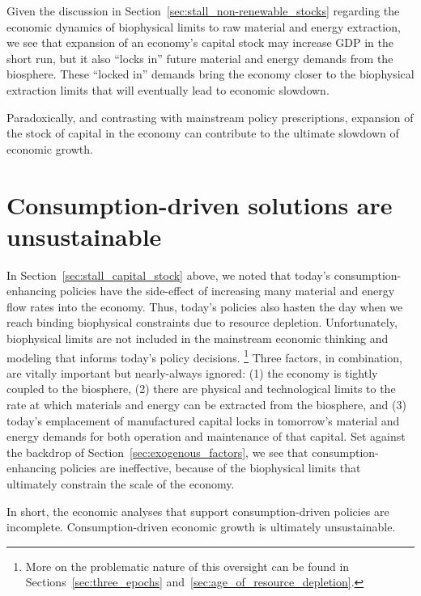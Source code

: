 Given the discussion in Section~\ref{sec:stall_non-renewable_stocks}
regarding the economic dynamics 
of biophysical limits to raw material and energy extraction,
we see that expansion of an economy's capital stock may increase GDP
in the short run, 
but it also ``locks in'' 
future material and energy demands 
from the biosphere.
These ``locked in'' demands bring the economy closer 
to the biophysical extraction limits 
that will eventually lead to economic slowdown.

\begin{svgraybox}
	Paradoxically, and contrasting with mainstream policy prescriptions,
	expansion of the stock of capital in the economy 
	can contribute to the ultimate slowdown of economic growth.
\end{svgraybox}


\section{Consumption-driven solutions are unsustainable}
\label{sec:consumption_unsustainable}

In Section~\ref{sec:stall_capital_stock} above, 
we noted that today's consumption-enhancing policies have the side-effect of
increasing many material and energy flow rates into the economy.
Thus, today's policies also
hasten the day when we reach binding biophysical constraints
due to resource depletion. 
Unfortunately, biophysical limits 
are not included in the mainstream economic thinking and modeling
that informs today's policy decisions.%
	\footnote{
	More on the problematic nature of this oversight
	can be found in Sections~\ref{sec:three_epochs} and~\ref{sec:age_of_resource_depletion}.
	}
Three factors, in combination, are vitally important 
but nearly-always ignored: 
(1) the economy is tightly coupled to the biosphere, 
(2) there are physical and technological limits 
	to the rate at which materials and energy can be extracted 
	from the biosphere, and 
(3) today's emplacement of manufactured capital locks in
	tomorrow's material and energy demands 
	for both operation and maintenance of that capital.
Set against the backdrop of Section~\ref{sec:exogenous_factors},
we see that consumption-enhancing policies are ineffective,
because of the biophysical limits that ultimately constrain the scale of the economy. 

In short, the economic analyses that support 
consumption-driven policies are incomplete.
Consumption-driven economic growth is ultimately unsustainable.

